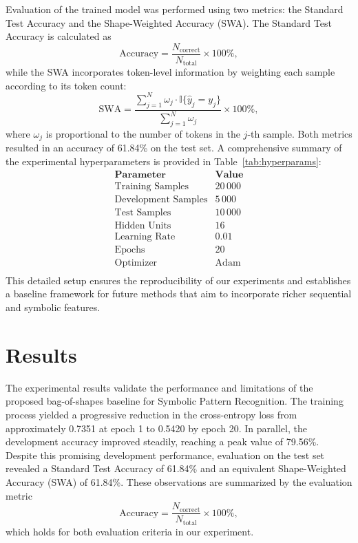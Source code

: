 \documentclass{article}
\begin{document}
Evaluation of the trained model was performed using two metrics: the Standard Test Accuracy and the Shape-Weighted Accuracy (SWA). The Standard Test Accuracy is calculated as
\[
\text{Accuracy} = \frac{N_{\text{correct}}}{N_{\text{total}}} \times 100\%,
\]
while the SWA incorporates token-level information by weighting each sample according to its token count:
\[
\text{SWA} = \frac{\sum_{j=1}^{N} \omega_j \cdot \mathbb{I}\{\hat{y}_j = y_j\}}{\sum_{j=1}^{N} \omega_j} \times 100\%,
\]
where \(\omega_j\) is proportional to the number of tokens in the \(j\)-th sample. Both metrics resulted in an accuracy of 61.84\% on the test set. A comprehensive summary of the experimental hyperparameters is provided in Table~\ref{tab:hyperparams}:
\[
\begin{array}{l|c}
\textbf{Parameter} & \textbf{Value} \\
\hline
\text{Training Samples} & 20\,000 \\
\text{Development Samples} & 5\,000 \\
\text{Test Samples} & 10\,000 \\
\text{Hidden Units} & 16 \\
\text{Learning Rate} & 0.01 \\
\text{Epochs} & 20 \\
\text{Optimizer} & \text{Adam} \\
\end{array}
\]
This detailed setup ensures the reproducibility of our experiments and establishes a baseline framework for future methods that aim to incorporate richer sequential and symbolic features.

\section{Results}
The experimental results validate the performance and limitations of the proposed bag-of-shapes baseline for Symbolic Pattern Recognition. The training process yielded a progressive reduction in the cross-entropy loss from approximately 0.7351 at epoch 1 to 0.5420 by epoch 20. In parallel, the development accuracy improved steadily, reaching a peak value of 79.56\%. Despite this promising development performance, evaluation on the test set revealed a Standard Test Accuracy of 61.84\% and an equivalent Shape-Weighted Accuracy (SWA) of 61.84\%. These observations are summarized by the evaluation metric
\[
\text{Accuracy} = \frac{N_{\text{correct}}}{N_{\text{total}}} \times 100\%,
\]
which holds for both evaluation criteria in our experiment.
\end{document}
